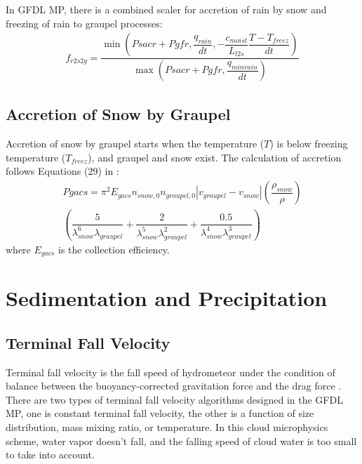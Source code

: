 \documentclass[letterpaper,titlepage,10pt]{article}
\numberwithin{equation}{section}
\begin{document}
In GFDL MP, there is a combined scaler for accretion of rain by snow and freezing of rain to graupel processes:
\begin{gather}
	f_{r2s2g} = \dfrac{\min \left(Psacr + Pgfr, \dfrac{q_{rain}}{dt}, - \dfrac{c_{moist}}{L_{l2s}} \dfrac{T - T_{freez}}{dt} \right)}{\max \left(Psacr + Pgfr, \dfrac{q_{minrain}}{dt} \right)}
\end{gather}


\subsection{Accretion of Snow by Graupel}

Accretion of snow by graupel starts when the temperature ($T$) is below freezing temperature ($T_{freez}$), and graupel and snow exist. The calculation of accretion follows Equations (29) in \citet{lin1983bulk}:
\begin{multline}
	Pgacs = \pi^2 E_{gacs} n_{snow,0} n_{graupel,0} \left \vert v_{graupel} - v_{snow} \right \vert \left(\dfrac{\rho_{snow}}{\rho} \right) \\
	\left(\dfrac{5}{\lambda^6_{snow} \lambda_{graupel}} + \dfrac{2}{\lambda^5_{snow} \lambda^2_{graupel}} + \dfrac{0.5}{\lambda^4_{snow} \lambda^3_{graupel}} \right)
\end{multline}
where $E_{gacs}$ is the collection efficiency.


\newpage
\section{Sedimentation and Precipitation}
\label{sec:sed}


\subsection{Terminal Fall Velocity}

Terminal fall velocity is the fall speed of hydrometeor under the condition of balance between the buoyancy-corrected gravitation force and the drag force \citep{pruppacher2010micr}. There are two types of terminal fall velocity algorithms designed in the GFDL MP, one is constant terminal fall velocity, the other is a function of size distribution, mass mixing ratio, or temperature. In this cloud microphysics scheme, water vapor doesn't fall, and the falling speed of cloud water is too small to take into account.
\end{document}

